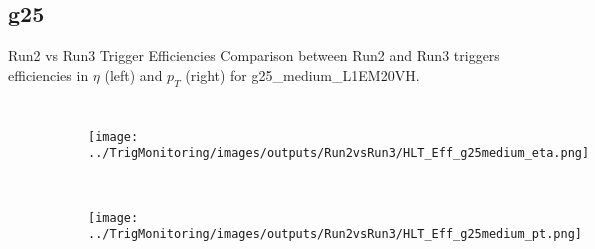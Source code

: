 \documentclass[aspectratio=1610,8pt]{beamer}					%
\begin{document}
\subsection{g25}
\begin{frame}{Run2 vs Run3 Trigger Efficiencies}
    Comparison between Run2 and Run3 triggers efficiencies in $\eta$ (left) and $p_T$ (right) for g25\_medium\_L1EM20VH.
    \begin{columns}
        \begin{figure}[h!]
            \centering
            \begin{subfigure}[b]{.45\textwidth}
                \centering
                \texttt{[image: ../TrigMonitoring/images/outputs/Run2vsRun3/HLT\_Eff\_g25medium\_eta.png]}
                \caption{~}
            \end{subfigure}
            \hfill
            \begin{subfigure}[b]{.45\textwidth}
                \centering
                \texttt{[image: ../TrigMonitoring/images/outputs/Run2vsRun3/HLT\_Eff\_g25medium\_pt.png]}
                \caption{~}
            \end{subfigure}
            \hfill
        \end{figure}


\end{columns}
\end{frame}
\end{document}
